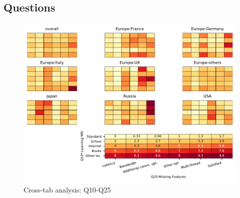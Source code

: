 
\subsection{Questions}


\begin{figure}
\begin{center}
\includegraphics[width=12cm]{../pdfs/Q10-Q25.pdf}
\caption{Cross-tab analysis: Q10-Q25}
\label{fig:Q10-Q25}
\end{center}
\end{figure}
